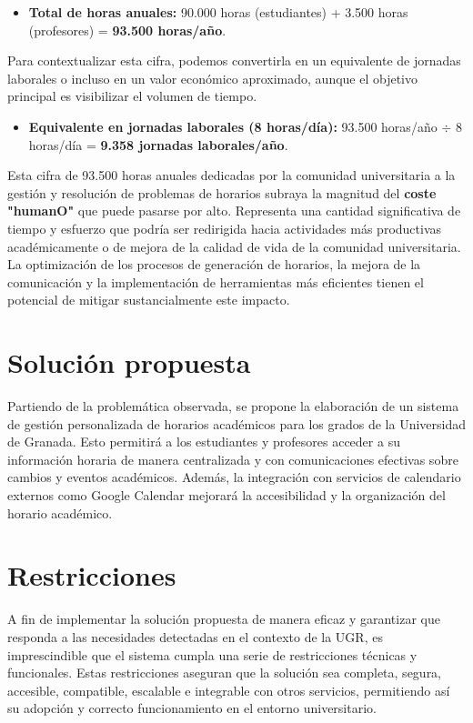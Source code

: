 \begin{itemize}
    \item \textbf{Total de horas anuales:} 90.000 horas (estudiantes) + 3.500 horas (profesores) = \textbf{93.500 horas/año}.
\end{itemize}

Para contextualizar esta cifra, podemos convertirla en un equivalente de jornadas laborales o incluso en un valor económico aproximado, aunque el objetivo principal es visibilizar el volumen de tiempo.

\begin{itemize}
    \item \textbf{Equivalente en jornadas laborales (8 horas/día):} 93.500 horas/año $\div$ 8 horas/día = \textbf{9.358 jornadas laborales/año}.
\end{itemize}

Esta cifra de 93.500 horas anuales dedicadas por la comunidad universitaria a la gestión y resolución de problemas de horarios subraya la magnitud del \textbf{coste "humanO"} que puede pasarse por alto. Representa una cantidad significativa de tiempo y esfuerzo que podría ser redirigida hacia actividades más productivas académicamente o de mejora de la calidad de vida de la comunidad universitaria. La optimización de los procesos de generación de horarios, la mejora de la comunicación y la implementación de herramientas más eficientes tienen el potencial de mitigar sustancialmente este impacto.

\section{Solución propuesta}

Partiendo de la problemática observada, se propone la elaboración de un sistema de gestión personalizada de horarios académicos para los grados de la Universidad de Granada. 
Esto permitirá a los estudiantes y profesores acceder a su información horaria de manera centralizada y con comunicaciones efectivas sobre cambios y eventos académicos. Además, la integración con servicios de calendario externos como Google Calendar mejorará la accesibilidad y la organización del horario académico.

\section{Restricciones}

A fin de implementar la solución propuesta de manera eficaz y garantizar que responda a las necesidades detectadas en el contexto de la UGR, es imprescindible que el sistema cumpla una serie de restricciones técnicas y funcionales. Estas restricciones aseguran que la solución sea completa, segura, accesible, compatible, escalable e integrable con otros servicios, permitiendo así su adopción y correcto funcionamiento en el entorno universitario.

